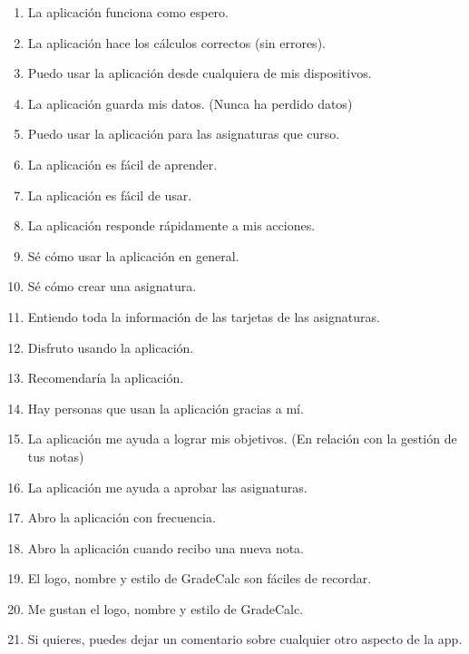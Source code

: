 \begin{enumerate}[noitemsep]
  \item La aplicación funciona como espero.
  \item La aplicación hace los cálculos correctos (sin errores).
  \item Puedo usar la aplicación desde cualquiera de mis dispositivos.
  \item La aplicación guarda mis datos. (Nunca ha perdido datos)
  \item Puedo usar la aplicación para las asignaturas que curso.
  \item La aplicación es fácil de aprender.
  \item La aplicación es fácil de usar.
  \item La aplicación responde rápidamente a mis acciones.
  \item Sé cómo usar la aplicación en general.
  \item Sé cómo crear una asignatura.
  \item Entiendo toda la información de las tarjetas de las  asignaturas.
  \item Disfruto usando la aplicación.
  \item Recomendaría la aplicación.
  \item Hay personas que usan la aplicación gracias a mí.
  \item La aplicación me ayuda a lograr mis objetivos. (En relación con la gestión de tus notas)
  \item La aplicación me ayuda a aprobar las asignaturas.
  \item Abro la aplicación con frecuencia.
  \item Abro la aplicación cuando recibo una nueva nota.
  \item El logo, nombre y estilo de GradeCalc son fáciles de recordar.
  \item Me gustan el logo, nombre y estilo de GradeCalc.
  \item Si quieres, puedes dejar un comentario sobre cualquier otro aspecto de la app. %
\end{enumerate}










